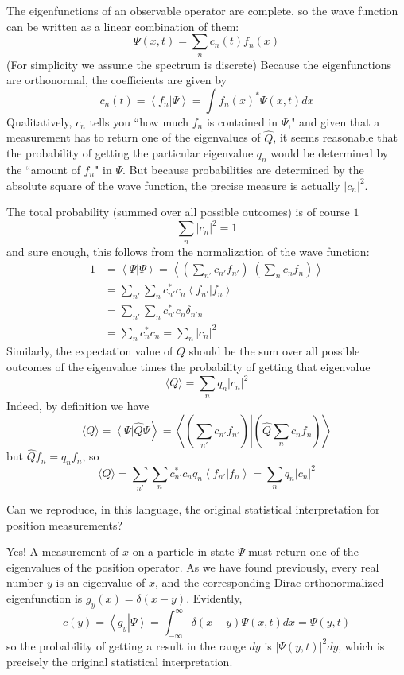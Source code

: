 \documentclass[12pt, a4paper, oneside, openright, titlepage]{book}
\newcommand{\braket}[2]{\left\langle#1\right\vert\left.#2\right\rangle}
\begin{document}
The eigenfunctions of an observable operator are complete, so the wave function can be written as a linear combination of them: $$\Psi(x,t) = \sum_nc_n(t)f_n(x)$$
(For simplicity we assume the spectrum is discrete) Because the eigenfunctions are orthonormal, the coefficients are given by $$c_n(t) = \braket{f_n}{\Psi} = \int f_n(x)^*\Psi(x,t)dx$$
Qualitatively, $c_n$ tells you ``how much $f_n$ is contained in $\Psi$," and given that a measurement has to return one of the eigenvalues of $\hat{Q}$, it seems reasonable that the probability of getting the particular eigenvalue $q_n$ would be determined by the ``amount of $f_n$" in $\Psi$. But because probabilities are determined by the absolute square of the wave function, the precise measure is actually $|c_n|^2$. 

The total probability (summed over all possible outcomes) is of course $1$ $$\sum_n|c_n|^2 = 1$$ and sure enough, this follows from the normalization of the wave function: \begin{align*}
    1 &= \braket{\Psi}{\Psi} = \braket{\left(\sum_{n'}c_{n'}f_{n'}\right)}{\left(\sum_nc_nf_n\right)} \\
    &= \sum_{n'}\sum_nc_{n'}^*c_n\braket{f_{n'}}{f_n} \\
    &= \sum_{n'}\sum_nc_{n'}^*c_n\delta_{n'n} \\
    &= \sum_{n}c_n^*c_n = \sum_{n}|c_n|^2
\end{align*}
Similarly, the expectation value of $Q$ should be the sum over all possible outcomes of the eigenvalue times the probability of getting that eigenvalue $$\langle Q\rangle = \sum_nq_n|c_n|^2$$
Indeed, by definition we have $$\langle Q\rangle = \braket{\Psi}{\hat{Q}\Psi} = \braket{\left(\sum_{n'}c_{n'}f_{n'}\right)}{\left(\hat{Q}\sum_nc_nf_n\right)}$$ 
but $\hat{Q}f_n = q_nf_n$, so $$\langle Q\rangle = \sum_{n'}\sum_nc_{n'}^*c_nq_n\braket{f_{n'}}{f_n} = \sum_nq_n|c_n|^2$$

\begin{qst}
    Can we reproduce, in this language, the original statistical interpretation for position measurements?
\end{qst}

Yes! A measurement of $x$ on a particle in state $\Psi$ must return one of the eigenvalues of the position operator. As we have found previously, every real number $y$ is an eigenvalue of $x$, and the corresponding Dirac-orthonormalized eigenfunction is $g_y(x) = \delta(x-y)$. Evidently, $$c(y) = \braket{g_y}{\Psi} = \int_{-\infty}^{\infty}\delta(x-y)\Psi(x,t)dx = \Psi(y,t)$$
so the probability of getting a result in the range $dy$ is $|\Psi(y,t)|^2dy$, which is precisely the original statistical interpretation.
\end{document}

